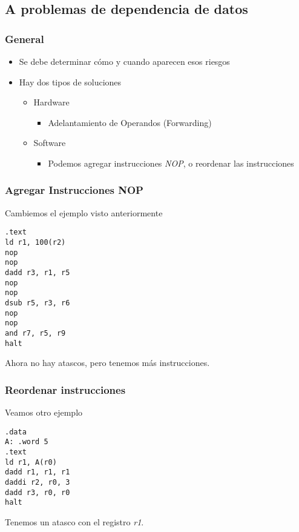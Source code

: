 \documentclass{beamer}
\begin{document}
\subsection{A problemas de dependencia de datos}
\begin{frame}
\frametitle{General}
\begin{itemize}
\item Se debe determinar cómo y cuando aparecen esos riesgos
\item Hay dos tipos de soluciones
\begin{itemize}
\item Hardware
\begin{itemize}
\item Adelantamiento de Operandos (Forwarding)
\end{itemize}
\item Software
\begin{itemize}
\item Podemos agregar instrucciones \emph{NOP}, o reordenar las instrucciones
\end{itemize}
\end{itemize}
\end{itemize}
\end{frame}

\begin{frame}[fragile]
\frametitle{Agregar Instrucciones NOP}

Cambiemos el ejemplo visto anteriormente
\begin{block}{}
\begin{lstlisting}[language=WinMIPS64,basicstyle=\ttfamily,keywordstyle=\color{blue}]
.text
ld r1, 100(r2)
nop
nop
dadd r3, r1, r5
nop
nop
dsub r5, r3, r6
nop
nop
and r7, r5, r9
halt
\end{lstlisting}
\end{block}
Ahora no hay atascos, pero tenemos más instrucciones.
\end{frame}



\begin{frame}[fragile]
\frametitle{Reordenar instrucciones}

Veamos otro ejemplo
\begin{block}{}
\begin{lstlisting}[language=WinMIPS64,basicstyle=\ttfamily,keywordstyle=\color{blue}]
.data
A: .word 5
.text
ld r1, A(r0)
dadd r1, r1, r1
daddi r2, r0, 3
dadd r3, r0, r0
halt
\end{lstlisting}
\end{block}
Tenemos un atasco con el registro \emph{r1}.

\end{frame}
\end{document}
